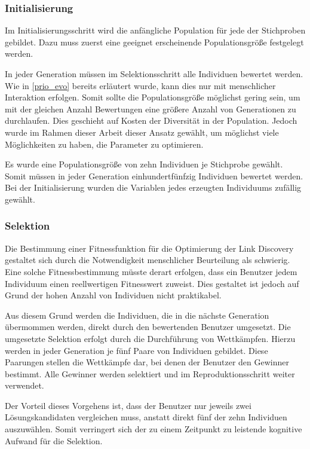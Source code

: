 \subsubsection{Initialisierung}

Im Initialisierungsschritt wird die anfängliche Population für jede der Stichproben gebildet. Dazu muss zuerst eine geeignet erscheinende Populationsgröße festgelegt werden.

In jeder Generation müssen im Selektionsschritt alle Individuen bewertet werden. Wie in \cref{prio_evo} bereits erläutert wurde, kann dies nur mit menschlicher Interaktion erfolgen. Somit sollte die Populationsgröße möglichst gering sein, um mit der gleichen Anzahl Bewertungen eine größere Anzahl von Generationen zu durchlaufen. Dies geschieht auf Kosten der Diversität in der Population. Jedoch wurde im Rahmen dieser Arbeit dieser Ansatz gewählt, um möglichst viele Möglichkeiten zu haben, die Parameter zu optimieren.

Es wurde eine Populationsgröße von zehn Individuen je Stichprobe gewählt. Somit müssen in jeder Generation einhundertfünfzig Individuen bewertet werden. Bei der Initialisierung wurden die Variablen jedes erzeugten Individuums zufällig gewählt.

\subsubsection{Selektion}

Die Bestimmung einer Fitnessfunktion für die Optimierung der Link Discovery gestaltet sich durch die Notwendigkeit menschlicher Beurteilung als schwierig. Eine solche Fitnessbestimmung müsste derart erfolgen, dass ein Benutzer jedem Individuum einen reellwertigen Fitnesswert zuweist. Dies gestaltet ist jedoch auf Grund der hohen Anzahl von Individuen nicht praktikabel.

Aus diesem Grund werden die Individuen, die in die nächste Generation übermommen werden, direkt durch den bewertenden Benutzer umgesetzt. Die umgesetzte Selektion erfolgt durch die Durchführung von Wettkämpfen. Hierzu werden in jeder Generation je fünf Paare von Individuen gebildet. Diese Paarungen stellen die Wettkämpfe dar, bei denen der Benutzer den Gewinner bestimmt. Alle Gewinner werden selektiert und im Reproduktionsschritt weiter verwendet.

Der Vorteil dieses Vorgehens ist, dass der Benutzer nur jeweils zwei Lösungskandidaten vergleichen muss, anstatt direkt fünf der zehn Individuen auszuwählen. Somit verringert sich der zu einem Zeitpunkt zu leistende kognitive Aufwand für die Selektion.


